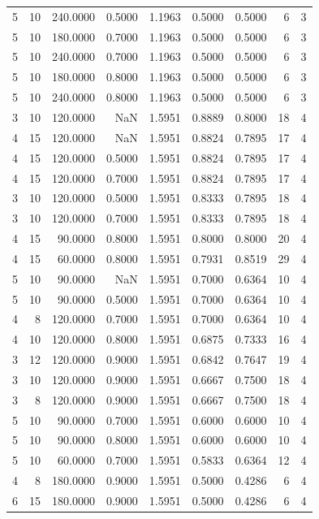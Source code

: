 \begin{tabular}{rrrrrrrrr}
5 & 10 & 240.0000 & 0.5000 & 1.1963 & 0.5000 & 0.5000 & 6 & 3 \\
5 & 10 & 180.0000 & 0.7000 & 1.1963 & 0.5000 & 0.5000 & 6 & 3 \\
5 & 10 & 240.0000 & 0.7000 & 1.1963 & 0.5000 & 0.5000 & 6 & 3 \\
5 & 10 & 180.0000 & 0.8000 & 1.1963 & 0.5000 & 0.5000 & 6 & 3 \\
5 & 10 & 240.0000 & 0.8000 & 1.1963 & 0.5000 & 0.5000 & 6 & 3 \\
3 & 10 & 120.0000 & NaN & 1.5951 & 0.8889 & 0.8000 & 18 & 4 \\
4 & 15 & 120.0000 & NaN & 1.5951 & 0.8824 & 0.7895 & 17 & 4 \\
4 & 15 & 120.0000 & 0.5000 & 1.5951 & 0.8824 & 0.7895 & 17 & 4 \\
4 & 15 & 120.0000 & 0.7000 & 1.5951 & 0.8824 & 0.7895 & 17 & 4 \\
3 & 10 & 120.0000 & 0.5000 & 1.5951 & 0.8333 & 0.7895 & 18 & 4 \\
3 & 10 & 120.0000 & 0.7000 & 1.5951 & 0.8333 & 0.7895 & 18 & 4 \\
4 & 15 & 90.0000 & 0.8000 & 1.5951 & 0.8000 & 0.8000 & 20 & 4 \\
4 & 15 & 60.0000 & 0.8000 & 1.5951 & 0.7931 & 0.8519 & 29 & 4 \\
5 & 10 & 90.0000 & NaN & 1.5951 & 0.7000 & 0.6364 & 10 & 4 \\
5 & 10 & 90.0000 & 0.5000 & 1.5951 & 0.7000 & 0.6364 & 10 & 4 \\
4 & 8 & 120.0000 & 0.7000 & 1.5951 & 0.7000 & 0.6364 & 10 & 4 \\
4 & 10 & 120.0000 & 0.8000 & 1.5951 & 0.6875 & 0.7333 & 16 & 4 \\
3 & 12 & 120.0000 & 0.9000 & 1.5951 & 0.6842 & 0.7647 & 19 & 4 \\
3 & 10 & 120.0000 & 0.9000 & 1.5951 & 0.6667 & 0.7500 & 18 & 4 \\
3 & 8 & 120.0000 & 0.9000 & 1.5951 & 0.6667 & 0.7500 & 18 & 4 \\
5 & 10 & 90.0000 & 0.7000 & 1.5951 & 0.6000 & 0.6000 & 10 & 4 \\
5 & 10 & 90.0000 & 0.8000 & 1.5951 & 0.6000 & 0.6000 & 10 & 4 \\
5 & 10 & 60.0000 & 0.7000 & 1.5951 & 0.5833 & 0.6364 & 12 & 4 \\
4 & 8 & 180.0000 & 0.9000 & 1.5951 & 0.5000 & 0.4286 & 6 & 4 \\
6 & 15 & 180.0000 & 0.9000 & 1.5951 & 0.5000 & 0.4286 & 6 & 4 \\

\end{tabular}
